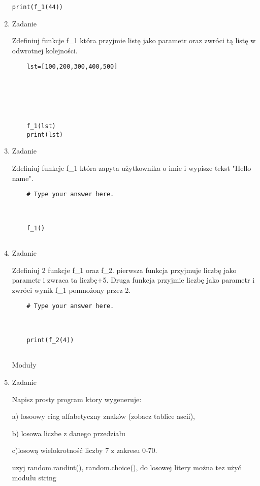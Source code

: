 \documentclass[11pt]{article}
\begin{document}
\begin{enumerate}
\begin{lstlisting}
print(f_1(44))
\end{lstlisting}

\par
\item 
\begin{Large}
	Zadanie
\end{Large}
\par
Zdefiniuj funkcje f\_1 która przyjmie listę jako parametr oraz zwróci tą listę w odwrotnej kolejności.
\begin{lstlisting}
	lst=[100,200,300,400,500]
	
	
	
	
	
	
	f_1(lst)
	print(lst)
\end{lstlisting}

\par
\item 
\begin{Large}
	Zadanie
\end{Large}
\par
Zdefiniuj funkcje f\_1 która zapyta użytkownika o imie i wypisze tekst "Hello {name}".
\begin{lstlisting}
	# Type your answer here.
	
	
	
	f_1()
	
\end{lstlisting}


\par
\item 
\begin{Large}
	Zadanie
\end{Large}
\par
Zdefiniuj 2 funkcje f\_1 oraz f\_2. pierwsza funkcja przyjmuje liczbę jako parametr i zwraca ta liczbę+5. Druga funkcja przyjmie liczbę jako parametr i zwróci wynik f\_1 pomnożony przez 2.
\begin{lstlisting}
	# Type your answer here.
	
	
	
	print(f_2(4))
	
\end{lstlisting}

\medskip
\begin{Large}
	Moduły
\end{Large}
\par

\item 
\begin{Large}
	Zadanie
\end{Large}
\par
Napisz prosty program ktory wygeneruje:
\par
a) losoowy ciag alfabetyczny znaków (zobacz tablice ascii),
\par
b) losowa liczbe z danego przedziału
\par
c)losową wielokrotność liczby 7 z zakresu 0-70.
\par
uzyj random.randint(), random.choice(),
do losowej litery można tez użyć modułu string


\end{enumerate}
\end{document}
